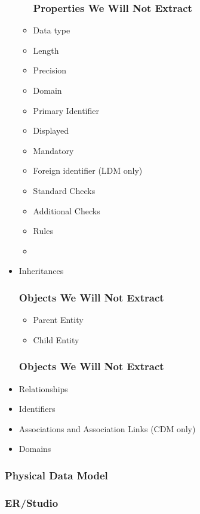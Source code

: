 \begin{itemize}
\begin{itemize}
		\subsubsection{Properties We Will Not Extract}
		\item Data type 
		\item Length 
		\item Precision
		\item Domain
		\item Primary Identifier
		\item Displayed
		\item Mandatory
		\item Foreign identifier (LDM only)
		\item Standard Checks
		\item Additional Checks
		\item Rules
		\item {}
	\end{itemize}
	\item Inheritances
	\subsubsection{Objects We Will Not Extract}
	\begin{itemize}
		\item Parent Entity
		\item Child Entity
	\end{itemize}
	\subsubsection{Objects We Will Not Extract}
	\item Relationships
	\item Identifiers
	\item Associations and Association Links (CDM only)
	\item Domains
\end{itemize}

\subsubsection{Physical Data Model}

\subsubsection{ER/Studio}

